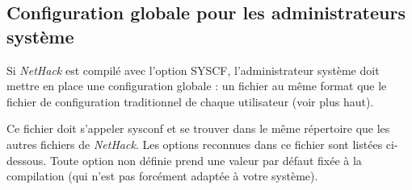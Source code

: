\documentclass[titlepage]{article}
\begin{document}
\subsection*{Configuration globale pour les administrateurs système}

Si \textit{NetHack} est compilé avec l'option SYSCF, l'administrateur système
doit mettre en place une configuration globale : un fichier au
même format que le fichier de configuration traditionnel de chaque utilisateur (voir plus haut).

Ce fichier doit s'appeler sysconf et se trouver dans le même répertoire que
les autres fichiers de \textit{NetHack}.
Les options reconnues dans ce fichier sont listées ci-dessous. Toute option non
définie prend une valeur par défaut fixée à la compilation (qui n'est pas forcément
adaptée à votre système).
\end{document}
